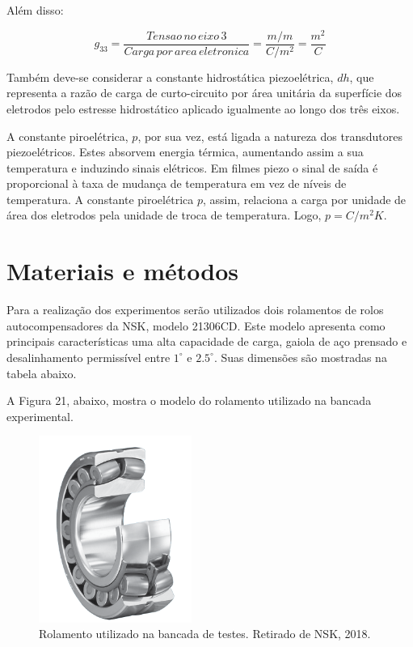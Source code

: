 \documentclass[
	12pt,				
	oneside,			
	a4paper,			
	english,			
	brazil				
	]{abntex2ppgsi}
\begin{document}
Além disso:

\[g_{33} = \frac{Tensao \,no \,eixo \,3}{Carga \,por \,area \,eletronica} = \frac{m/m}{C/m^{2}} = \frac{m^{2}}{C} \]

Também deve-se considerar a constante hidrostática piezoelétrica, $dh$, que representa a razão de carga de curto-circuito por área unitária da superfície dos eletrodos pelo estresse hidrostático aplicado igualmente ao longo dos três eixos. 

A constante piroelétrica, $p$, por sua vez, está ligada a natureza dos transdutores piezoelétricos. Estes absorvem energia térmica, aumentando assim a sua temperatura e induzindo sinais elétricos. Em filmes piezo o sinal de saída é proporcional à taxa de mudança de temperatura em vez de níveis de temperatura. A constante piroelétrica $p$, assim, relaciona a carga por unidade de área dos eletrodos pela unidade de troca de temperatura. Logo, $p = C/m^{2} K$.



\chapter{Materiais e métodos}

Para a realização dos experimentos serão utilizados dois rolamentos de rolos autocompensadores da NSK, modelo 21306CD. Este modelo apresenta como principais características uma alta capacidade de carga, gaiola de aço prensado e desalinhamento permissível entre $1^{\circ}$ e $2.5^{\circ}$. Suas dimensões são mostradas na tabela abaixo.  

A Figura 21, abaixo, mostra o modelo do rolamento utilizado na bancada experimental.

\begin{figure}[!htb]
\centering
\includegraphics[width=50mm]{Figura24}
\caption {Rolamento utilizado na bancada de testes. Retirado de NSK, 2018.}
\label{Figura24}
\end{figure} 
\end{document}
